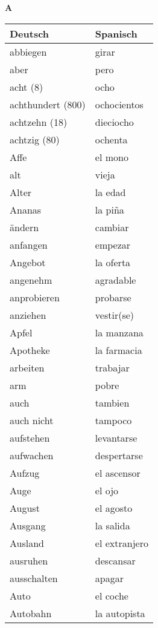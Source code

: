 \begin{flushright}\begin{Huge}\textbf{A}\end{Huge}\end{flushright}

\begin{longtable}{p{} p{}} 
\textbf{Deutsch}     & \textbf{Spanisch}                                       \\ \hline
\hline
\endhead %
abbiegen & girar\\
aber & pero\\
acht (8) & ocho\\
achthundert (800) & ochocientos\\
achtzehn (18) & dieciocho\\
achtzig (80) & ochenta\\
Affe & el mono\\
alt & vieja\\
Alter & la edad\\
Ananas & la piña\\
ändern & cambiar\\
anfangen & empezar\\
Angebot & la oferta \\
angenehm & agradable\\
anprobieren & probarse\\
anziehen & vestir(se)\\
Apfel & la manzana \\
Apotheke & la farmacia\\
arbeiten & trabajar\\
arm & pobre\\
auch & tambien\\
auch nicht & tampoco\\
aufstehen & levantarse\\
aufwachen & despertarse\\
Aufzug & el ascensor\\
Auge & el ojo\\
August & el agosto\\
Ausgang & la salida\\
Ausland & el extranjero\\
ausruhen & descansar\\
ausschalten & apagar\\
Auto & el coche \\
Autobahn & la autopista\\
\end{longtable}

